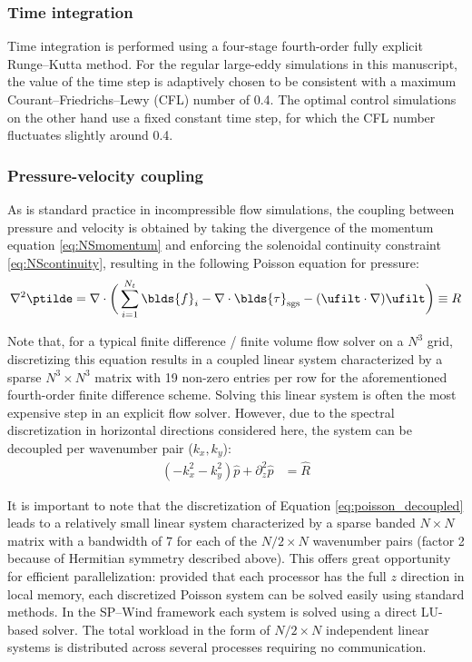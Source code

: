 \subsubsection{Time integration}
Time integration is performed using a four-stage fourth-order fully explicit Runge--Kutta method. For the regular large-eddy simulations in this manuscript, the value of the time step is adaptively chosen to be consistent with a maximum Courant--Friedrichs--Lewy (CFL) number of 0.4. The optimal control simulations on the other hand use a fixed constant time step, for which the CFL number fluctuates slightly around 0.4. 

\subsubsection{Pressure-velocity coupling}
As is standard practice in incompressible flow simulations, the coupling between pressure and velocity is obtained by taking the divergence of the momentum equation \eqref{eq:NSmomentum} and enforcing the solenoidal continuity constraint \eqref{eq:NScontinuity}, resulting in the following Poisson equation for pressure: 
\begin{equation}
	\nabla^2 \ptilde = \nabla \cdot \bigg( \sum_{i=1}^{N_t} \blds{f}_i - \nabla \cdot \blds{\tau}_{\text{sgs}} - (\ufilt \cdot \nabla) \ufilt \bigg) \equiv R
\end{equation}

Note that, for a typical finite difference / finite volume flow solver on a $N^3$ grid, discretizing this equation results in a coupled linear system characterized by a sparse $N^3 \times N^3$ matrix with 19 non-zero entries per row for the aforementioned fourth-order finite difference scheme. Solving this linear system is often the most expensive step in an explicit flow solver. However, due to the spectral discretization in horizontal directions considered here, the system can be decoupled per wavenumber pair ($k_x, k_y$):
\begin{align}
	(-k_x^2 - k_y^2) \hat{p} + \partial^2_z \hat{p} &= \hat{R}\label{eq:poisson_decoupled}
\end{align}

It is important to note that the discretization of Equation \eqref{eq:poisson_decoupled} leads to a relatively small linear system characterized by a sparse banded $N \times N$ matrix with a bandwidth of 7 for each of the $N/2 \times N$ wavenumber pairs (factor 2 because of Hermitian symmetry described above). This offers great opportunity for efficient parallelization: provided that each processor has the full $z$ direction in local memory, each discretized Poisson system can be solved easily using standard methods. In the SP--Wind framework each system is solved using a direct LU-based solver. The total workload in the form of $N/2 \times N$ independent linear systems is distributed across several processes requiring no communication.


